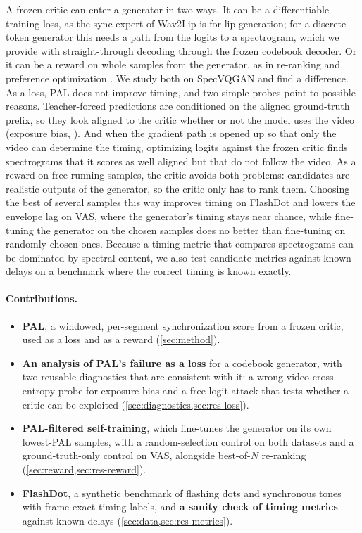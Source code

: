 A frozen critic can enter a generator in two ways. It can be a differentiable training loss, as the sync expert of Wav2Lip \citep{prajwal2020wav2lip} is for lip generation; for a discrete-token generator this needs a path from the logits to a spectrogram, which we provide with straight-through decoding through the frozen codebook decoder. Or it can be a reward on whole samples from the generator, as in re-ranking \citep{du2023conditional} and preference optimization \citep{chan2026v2adpo,cheng2026syncdpo}. We study both on SpecVQGAN and find a difference. As a loss, PAL does not improve timing, and two simple probes point to possible reasons. Teacher-forced predictions are conditioned on the aligned ground-truth prefix, so they look aligned to the critic whether or not the model uses the video (exposure bias, \citealp{bengio2015scheduled,ranzato2016sequence}). And when the gradient path is opened up so that only the video can determine the timing, optimizing logits against the frozen critic finds spectrograms that it scores as well aligned but that do not follow the video. As a reward on free-running samples, the critic avoids both problems: candidates are realistic outputs of the generator, so the critic only has to rank them. Choosing the best of several samples this way improves timing on FlashDot and lowers the envelope lag on VAS, where the generator's timing stays near chance, while fine-tuning the generator on the chosen samples does no better than fine-tuning on randomly chosen ones. Because a timing metric that compares spectrograms can be dominated by spectral content, we also test candidate metrics against known delays on a benchmark where the correct timing is known exactly.

\paragraph{Contributions.}
\begin{itemize}
  \item \textbf{PAL}, a windowed, per-segment synchronization score from a frozen critic, used as a loss and as a reward (\cref{sec:method}).
  \item \textbf{An analysis of PAL's failure as a loss} for a codebook generator, with two reusable diagnostics that are consistent with it: a wrong-video cross-entropy probe for exposure bias and a free-logit attack that tests whether a critic can be exploited (\cref{sec:diagnostics,sec:res-loss}).
  \item \textbf{PAL-filtered self-training}, which fine-tunes the generator on its own lowest-PAL samples, with a random-selection control on both datasets and a ground-truth-only control on VAS, alongside best-of-$N$ re-ranking (\cref{sec:reward,sec:res-reward}).
  \item \textbf{FlashDot}, a synthetic benchmark of flashing dots and synchronous tones with frame-exact timing labels, and \textbf{a sanity check of timing metrics} against known delays (\cref{sec:data,sec:res-metrics}).
\end{itemize}
